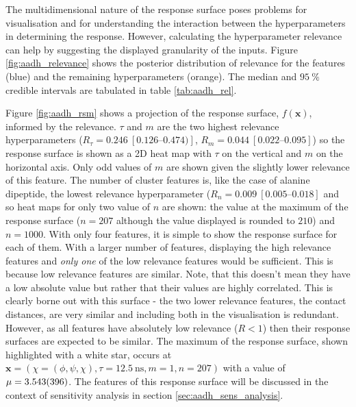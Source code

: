 The multidimensional nature of the response surface poses problems for visualisation and for understanding the interaction between the hyperparameters in determining the response. However, calculating the hyperparameter relevance can help by suggesting the displayed granularity of the inputs. Figure \ref{fig:aadh_relevance} shows the posterior distribution of relevance for the features (blue) and the remaining hyperparameters (orange). The median and $\SI{95}{\percent}$ credible intervals are tabulated in table \ref{tab:aadh_rel}. 

Figure \ref{fig:aadh_rsm} shows a projection of the response surface, $f(\mathbf{x})$, informed by the relevance. $\tau$ and $m$ are the two highest relevance hyperparameters ($R_{\tau} = \num{0.246}\ [\numrange[range-phrase=\text{--}]{0.126}{0.474})]$, $R_{m} = \num{0.044}\ [\numrange[range-phrase=\text{--}]{0.022}{0.095}]$) so the response surface is shown as a 2D heat map with $\tau$ on the vertical and $m$ on the horizontal axis. Only odd values of $m$ are shown given the slightly lower relevance of this feature. The number of cluster features is, like the case of alanine dipeptide, the lowest relevance hyperparameter ($R_{n} = \num{0.009}\ [\numrange[range-phrase=\text{--}]{0.005}{0.018}]$ and so heat maps for only two value of $n$ are shown: the value at the maximum of the response surface ($n=207$ although the value displayed is rounded to $210$) and $n=1000$. With only four features, it is  simple to show the response surface for each of them. With a larger number of features, displaying the high relevance features and \emph{only one} of the low relevance features would be sufficient. This is because low relevance features are similar.  Note, that this doesn't mean they have a low absolute value but rather that their values are highly correlated. This is clearly borne out with this surface - the two lower relevance features, the contact distances, are very similar and including both in the visualisation is redundant. However, as all features have absolutely low relevance ($R<1$) then their response surfaces are expected to be similar. The maximum of the response surface, shown highlighted with a  white star, occurs at $\mathbf{x}=\left(\chi=(\phi, \psi, \chi), \tau = \SI{12.5}{\nano\second}, m=1, n=207\right)$ with a value of $\mu=\num{3.543 \pm 0.396}$. The features of this response surface will be discussed in the context of sensitivity analysis in section \ref{sec:aadh_sens_analysis}. 

